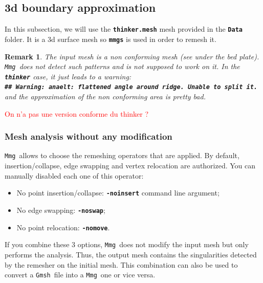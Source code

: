 \documentclass{article}
\newtheorem{remark}{Remark}[section]
\newcommand{\ttb}[1]{\texttt{\textbf{#1}}}
\newcommand{\mmg}{\texttt{Mmg}}
\newcommand{\gmsh}{\texttt{Gmsh}}
\begin{document}
\subsection{3d boundary approximation}
In this subsection, we will use the \ttb{thinker.mesh} mesh provided
in the \ttb{Data} folder. It is a 3d surface mesh so
\ttb{mmgs} is used in order to remesh it.

\begin{remark}
The input mesh is a non conforming mesh (see under the
bed plate). \mmg\ does not detect such patterns and is not supposed to work on it.
In the \ttb{thinker} case, it just leads to a warning:\\
\ttb{\#\# Warning: anaelt: flattened angle around ridge. Unable to split it.\\}
 and the approximation of the non conforming area is pretty bad.
 \end{remark}

\textcolor{red}{On n'a pas une version conforme du thinker ?}

\subsubsection{Mesh analysis without any modification}
\mmg\ allows to choose the remeshing operators that are applied. By
default, insertion/collapse, edge swapping and vertex relocation are
authorized. You can manually disabled each one of this operator:
\begin{itemize}
\item No point insertion/collapse: \ttb{-noinsert} command line argument;
\item No edge swapping: \ttb{-noswap};
\item No point relocation: \ttb{-nomove}.
\end{itemize}

If you combine these 3 options, \mmg\ does not modify the input mesh but only
performs the analysis. Thus, the output mesh contains the singularities
detected by the remesher on the initial mesh. This combination can
also be used to convert a \gmsh\ file into a \mmg\ one or vice versa.
\end{document}
